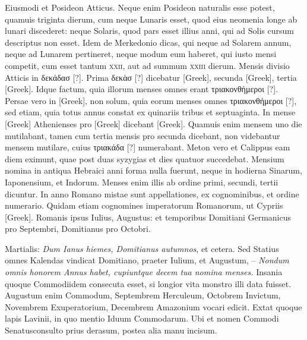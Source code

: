 Eiusmodi et Posideon Atticus.
Neque enim Posideon
naturalis esse potest, quamuis triginta dierum, cum neque Lunaris
esset, quod eius neomenia longe ab lunari discederet: neque Solaris,
quod pars esset illius anni, qui ad Solis cursum descriptus non esset.
Idem de Merkedonio dicas, qui neque ad Solarem annum, neque ad
Lunarem pertineret, neque modum eum haberet, qui iusto mensi
competit, cum esset tantum \textsc{xxii}, aut ad summum \textsc{xxiii} dierum.
Mensis divisio Atticis in \textgreek{δεκάδασ [?]}.
Prima \textgreek{δεκὰσ [?]} dicebatur \textgreek{[Greek]},
secunda \textgreek{[Greek]}, tertia \textgreek{[Greek]}.
Idque factum, quia
illorum menses omnes erant \textgreek{τριακονθήμεροι [?]}.
Persae vero in \textgreek{[Greek]},
non solum, quia eorum menses omnes \textgreek{τριακονθήμεροι [?]},
 sed etiam, quia
totus annus constat ex quinariis tribus et septuaginta.
In mense \textgreek{[Greek]}
Athenienses pro \textgreek{[Greek]} dicebant \textgreek{[Greek]}.
Quamuis
enim mensem uno die mutilabant, tamen cum tertia mensis
pro secunda dicebant, non videbantur mensem mutilare, cuius
\textgreek{τριακάδα [?]} numerabant.
Meton vero et Calippus eam diem eximunt,
quae post duas syzygias et dies quatuor succedebat.
Mensium nomina
in antiqua Hebraici anni forma nulla fuerunt, neque in hodierna
Sinarum, Iaponensium, et Indorum.
Menses enim illis ab ordine
primi, secundi, tertii dicuntur.
In anno Romano mistae sunt appellationes,
ex cognominibus, et ordine numerario.
Quidam etiam cognomines
imperatorum Romanorum, ut Cypriis \textgreek{[Greek]}.
Romanis ipsus Iulius, Augustus: et temporibus Domitiani
Germanicus pro Septembri, Domitianus pro Octobri.

Martialis:
 \textit{Dum Ianus hiemes, Domitianus
autumnos}, et cetera.
Sed Statius omnes
Kalendas vindicat Domitiano,
praeter Iulium, et Augustum,
– \textit{Nondum omnis honorem
Annus habet, cupiuntque decem tua
nomina menses.}
Insania quoque
Commodiidem consecuta esset, si
longior vita monstro illi data fuisset.
Augustum enim Commodum,
Septembrem Herculeum, Octobrem
Invictum, Novembrem
Exuperatorium, Decembrem
Amazonium vocari edicit.
Extat
quoque lapis Lavinii, in quo mentio
Iduum Commodarum.
Ubi et
nomen Commodi Senatusconsulto prius derasum, postea alia manu
incisum.

